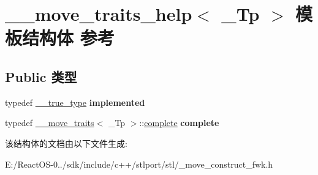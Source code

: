 \hypertarget{struct____move__traits__help}{}\section{\+\_\+\+\_\+move\+\_\+traits\+\_\+help$<$ \+\_\+\+Tp $>$ 模板结构体 参考}
\label{struct____move__traits__help}
\subsection*{Public 类型}
\begin{DoxyCompactItemize}
\item 
\mbox{\label{struct____move__traits__help_ad9cc2b09842cb9ef399e9cfd8f108d98}} 
typedef \hyperlink{struct____true__type}{\+\_\+\+\_\+true\+\_\+type} {\bfseries implemented}
\item 
\mbox{\label{struct____move__traits__help_a954f4068c0e06bcfdcb6d58709071871}} 
typedef \hyperlink{struct____move__traits}{\+\_\+\+\_\+move\+\_\+traits}$<$ \+\_\+\+Tp $>$\+::\hyperlink{struct____true__type}{complete} {\bfseries complete}
\end{DoxyCompactItemize}


该结构体的文档由以下文件生成\+:\begin{DoxyCompactItemize}
\item 
E\+:/\+React\+O\+S-\/0../sdk/include/c++/stlport/stl/\+\_\+move\+\_\+construct\+\_\+fwk.\+h\end{DoxyCompactItemize}
